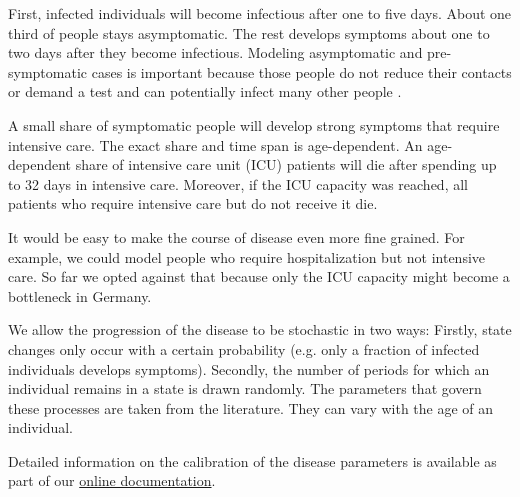 First, infected individuals will become infectious after one to five days. About one third of people stays asymptomatic. The rest develops symptoms about one to two days after they become infectious. Modeling asymptomatic and pre-symptomatic cases is important because those people do not reduce their contacts or demand a test and can potentially infect many other people \citep{Donsimoni2020}.

A small share of symptomatic people will develop strong symptoms that require intensive care. The exact share and time span is age-dependent. An age-dependent share of intensive care unit (ICU) patients will die after spending up to 32 days in intensive care. Moreover, if the ICU capacity was reached, all patients who require intensive care but do not receive it die.

It would be easy to make the course of disease even more fine grained. For example, we could model people who require hospitalization but not intensive care. So far we opted against that because only the ICU capacity might become a bottleneck in Germany.

We allow the progression of the disease to be stochastic in two ways: Firstly, state changes only occur with a certain probability (e.g. only a fraction of infected individuals develops symptoms). Secondly, the number of periods for which an individual remains in a state is drawn randomly. The parameters that govern these processes are taken from the literature. They can vary with the age of an individual.

Detailed information on the calibration of the disease parameters is available as part of our \href{https://sid-dev.readthedocs.io/en/latest/reference_guides/epi_params.html}{online documentation}.

